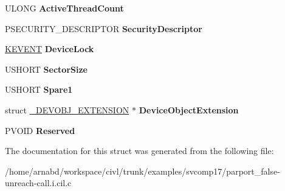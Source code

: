 \begin{DoxyCompactItemize}
\item 
\hypertarget{struct__DEVICE__OBJECT_aaeb3c7ee6e9a1a420a8ee878dcb41483}{}U\+L\+O\+N\+G {\bfseries Active\+Thread\+Count}\label{struct__DEVICE__OBJECT_aaeb3c7ee6e9a1a420a8ee878dcb41483}

\item 
\hypertarget{struct__DEVICE__OBJECT_a5c3a5d4691eed77e2ca79ae6b4346fbe}{}P\+S\+E\+C\+U\+R\+I\+T\+Y\+\_\+\+D\+E\+S\+C\+R\+I\+P\+T\+O\+R {\bfseries Security\+Descriptor}\label{struct__DEVICE__OBJECT_a5c3a5d4691eed77e2ca79ae6b4346fbe}

\item 
\hypertarget{struct__DEVICE__OBJECT_a274d5b99ff6283d9794422d65aa91925}{}\hyperlink{struct__KEVENT}{K\+E\+V\+E\+N\+T} {\bfseries Device\+Lock}\label{struct__DEVICE__OBJECT_a274d5b99ff6283d9794422d65aa91925}

\item 
\hypertarget{struct__DEVICE__OBJECT_aa7fee5f9f8bde502641bf0820b278625}{}U\+S\+H\+O\+R\+T {\bfseries Sector\+Size}\label{struct__DEVICE__OBJECT_aa7fee5f9f8bde502641bf0820b278625}

\item 
\hypertarget{struct__DEVICE__OBJECT_af28d8fd6e09af3a964976b2b6b2041a6}{}U\+S\+H\+O\+R\+T {\bfseries Spare1}\label{struct__DEVICE__OBJECT_af28d8fd6e09af3a964976b2b6b2041a6}

\item 
\hypertarget{struct__DEVICE__OBJECT_aaf936c20d1b0e02593e26b133570b38a}{}struct \hyperlink{struct__DEVOBJ__EXTENSION}{\+\_\+\+D\+E\+V\+O\+B\+J\+\_\+\+E\+X\+T\+E\+N\+S\+I\+O\+N} $\ast$ {\bfseries Device\+Object\+Extension}\label{struct__DEVICE__OBJECT_aaf936c20d1b0e02593e26b133570b38a}

\item 
\hypertarget{struct__DEVICE__OBJECT_a3d5d6e2d1a27255d808943dcd4b7eab9}{}P\+V\+O\+I\+D {\bfseries Reserved}\label{struct__DEVICE__OBJECT_a3d5d6e2d1a27255d808943dcd4b7eab9}

\end{DoxyCompactItemize}


The documentation for this struct was generated from the following file\+:\begin{DoxyCompactItemize}
\item 
/home/arnabd/workspace/civl/trunk/examples/svcomp17/parport\+\_\+false-\/unreach-\/call.\+i.\+cil.\+c\end{DoxyCompactItemize}
